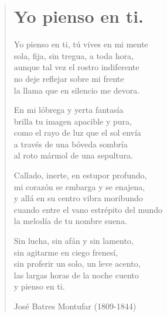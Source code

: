\documentclass[12pt, twoside]{book}
\begin{document}
\newpage
\begin{verse}
\begin{center}
\section{Yo pienso en ti.}
\end{center}
Yo pienso en ti, tú vives en mi mente\\
sola, fija, sin tregua, a toda hora,\\
aunque tal vez el rostro indiferente\\
no deje reflejar sobre mi frente\\
la llama que en silencio me devora.
\newline

En mi lóbrega y yerta fantasía\\
brilla tu imagen apacible y pura,\\
como el rayo de luz que el sol envía\\
a través de una bóveda sombría\\
al roto mármol de una sepultura.
\newline

Callado, inerte, en estupor profundo,\\
mi corazón se embarga y se enajena,\\
y allá en su centro vibra moribundo\\
cuando entre el vano estrépito del mundo\\
la melodía de tu nombre suena.
\newline

Sin lucha, sin afán y sin lamento,\\
sin agitarme en ciego frenesí,\\
sin proferir un solo, un leve acento,\\
las largas horas de la noche cuento\\
y pienso en ti.
\newline

José Batres Montufar (1809-1844)
\end{verse}
\end{document}
